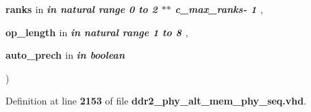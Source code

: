 {\begin{DoxyParamCaption}
\item[{}]{{\bfseries \textcolor{vhdlchar}{ranks}\textcolor{vhdlchar}{ }}\textcolor{stringliteral}{in} {\em {\bfseries \textcolor{keywordflow}{in}\textcolor{vhdlchar}{ }\textcolor{comment}{natural}\textcolor{vhdlchar}{ }\textcolor{vhdlchar}{ }\textcolor{vhdlchar}{ }\textcolor{keywordflow}{range}\textcolor{vhdlchar}{ }\textcolor{vhdlchar}{ } \textcolor{vhdldigit}{0} \textcolor{vhdlchar}{ }\textcolor{keywordflow}{to}\textcolor{vhdlchar}{ }\textcolor{vhdlchar}{ } \textcolor{vhdldigit}{2} \textcolor{vhdlchar}{$\ast$}\textcolor{vhdlchar}{$\ast$}\textcolor{vhdlchar}{ }\textcolor{vhdlchar}{ }\textcolor{vhdlchar}{ }\textcolor{vhdlchar}{c\+\_\+max\+\_\+ranks}\textcolor{vhdlchar}{-\/}\textcolor{vhdlchar}{ } \textcolor{vhdldigit}{1} \textcolor{vhdlchar}{ }}} , }
\item[{}]{{\bfseries \textcolor{vhdlchar}{op\+\_\+length}\textcolor{vhdlchar}{ }}\textcolor{stringliteral}{in} {\em {\bfseries \textcolor{keywordflow}{in}\textcolor{vhdlchar}{ }\textcolor{comment}{natural}\textcolor{vhdlchar}{ }\textcolor{vhdlchar}{ }\textcolor{vhdlchar}{ }\textcolor{keywordflow}{range}\textcolor{vhdlchar}{ }\textcolor{vhdlchar}{ } \textcolor{vhdldigit}{1} \textcolor{vhdlchar}{ }\textcolor{keywordflow}{to}\textcolor{vhdlchar}{ }\textcolor{vhdlchar}{ } \textcolor{vhdldigit}{8} \textcolor{vhdlchar}{ }}} , }
\item[{}]{{\bfseries \textcolor{vhdlchar}{auto\+\_\+prech}\textcolor{vhdlchar}{ }}\textcolor{stringliteral}{in} {\em {\bfseries \textcolor{keywordflow}{in}\textcolor{vhdlchar}{ }\textcolor{comment}{boolean}\textcolor{vhdlchar}{ }\textcolor{vhdlchar}{ }\textcolor{vhdlchar}{ }}}}
\end{DoxyParamCaption}
)\hspace{0.3cm}{\ttfamily [Function]}}\label{class__ddr2__phy__alt__mem__phy__addr__cmd__pkg_ac984b5d53c98731299bcf10cc4d2a39d}


Definition at line {\bf 2153} of file {\bf ddr2\+\_\+phy\+\_\+alt\+\_\+mem\+\_\+phy\+\_\+seq.\+vhd}.

